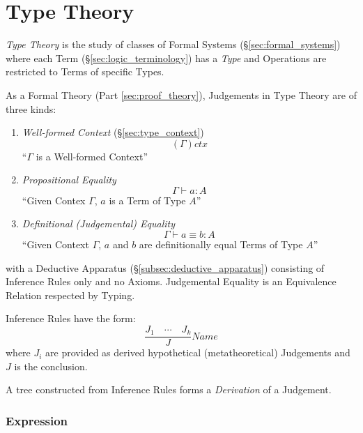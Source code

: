 \part{Type Theory}\label{sec:type_theory}

\emph{Type Theory} is the study of classes of Formal Systems
(\S\ref{sec:formal_systems}) where each Term
(\S\ref{sec:logic_terminology}) has a \emph{Type} and Operations
are restricted to Terms of specific Types.

As a Formal Theory (Part \ref{sec:proof_theory}), Judgements in Type
Theory are of three kinds\cite{hott13}:
\begin{enumerate}

\item \emph{Well-formed Context} (\S\ref{sec:type_context})
\[
    (\Gamma) ctx
\]
``$\Gamma$ is a Well-formed Context''

\item \emph{Propositional Equality}
\[
    \Gamma \vdash a : A
\]
``Given Contex $\Gamma$, $a$ is a Term of Type $A$''

\item \emph{Definitional (Judgemental) Equality}
\[
    \Gamma \vdash a \equiv b : A
\]
``Given Context $\Gamma$, $a$ and $b$ are definitionally equal Terms
of Type $A$''

\end{enumerate}
with a Deductive Apparatus (\S\ref{subsec:deductive_apparatus})
consisting of Inference Rules only and no Axioms. Judgemental Equality
is an Equivalence Relation respected by Typing.

Inference Rules have the form:
\[
    \frac{J_1 \quad \cdots \quad J_k} {J} Name
\]
where $J_i$ are provided as derived hypothetical (metatheoretical)
Judgements and $J$ is the conclusion.

A tree constructed from Inference Rules forms a \emph{Derivation} of a
Judgement.



\section{Expression}\label{sec:type_expression}

